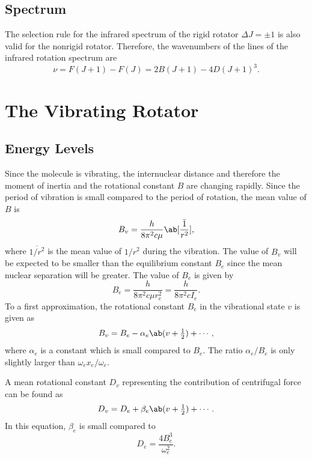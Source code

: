 \subsection{Spectrum}

The selection rule for the infrared spectrum of the rigid rotator $\Delta{}J = \pm 1$ is also valid for the nonrigid rotator. Therefore, the wavenumbers of the lines of the infrared rotation spectrum are
\begin{equation*}
    \nu = F(J + 1) - F(J) = 2B(J + 1) - 4D(J + 1)^3.
\end{equation*}

\section{The Vibrating Rotator}
\label{s:the_vibrating_rotator}

\subsection{Energy Levels}

Since the molecule is vibrating, the internuclear distance and therefore the moment of inertia and the rotational constant $B$ are changing rapidly. Since the period of vibration is small compared to the period of rotation, the mean value of $B$ is
\begin{equation*}
    B_v = \frac{h}{8\pi^2c\mu}\ab[\bar{\frac{1}{r^2}}],
\end{equation*}
where $\overline{1/r^2}$ is the mean value of $1/r^2$ during the vibration. The value of $B_v$ will be expected to be smaller than the equilibrium constant $B_e$ since the mean nuclear separation will be greater. The value of $B_e$ is given by
\begin{equation*}
    B_e = \frac{h}{8\pi^2c\mu{}r_e^2} = \frac{h}{8\pi^2cI_e}.
\end{equation*}
To a first approximation, the rotational constant $B_e$ in the vibrational state $v$ is given as
\begin{equation*}
    B_v = B_e - \alpha_e\ab(v + \tfrac{1}{2}) + \dotsb,
\end{equation*}
where $\alpha_e$ is a constant which is small compared to $B_e$. The ratio $\alpha_e/B_e$ is only slightly larger than $\omega_ex_e/\omega_e$.

A mean rotational constant $D_v$ representing the contribution of centrifugal force can be found as
\begin{equation*}
    D_v = D_e + \beta_e\ab(v + \tfrac{1}{2}) + \dotsb.
\end{equation*}
In this equation, $\beta_e$ is small compared to
\begin{equation*}
    D_e = \frac{4B_e^3}{\omega_e^2}.
\end{equation*}

